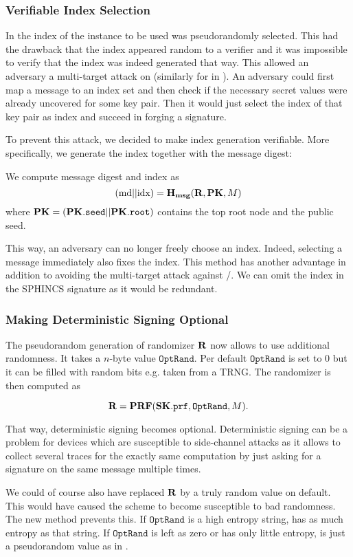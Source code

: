 \subsubsection{Verifiable Index Selection}
In \spc the index of the \horst instance to be used was pseudorandomly selected.
This had the drawback that the index appeared random to a verifier and it was
impossible to verify that the index was indeed generated that way. This allowed
an adversary a multi-target attack on \horst (similarly for \fors in \spx). An
adversary could first map a message to an index set and then check if the
necessary secret values were already uncovered for some \horst key pair. Then it
would just select the index of that \horst key pair as index and succeed in
forging a signature.

To prevent this attack, we decided to make index generation verifiable. More
specifically, we generate the index together with the message digest:

 We compute message digest and index as
        $$( \textrm{md} || \textrm{idx} ) = \mathbf{H_{msg}} ( \mathbf{R}, \mathbf{PK}, M )$$
 where $\mathbf{PK} = ( \mathbf{PK}.\texttt{seed} || \mathbf{PK}.\texttt{root} )$ contains the top root node and the public seed.

 This way, an adversary can no longer freely choose an index. Indeed, selecting
 a message immediately also fixes the index. This method has another advantage
 in addition to avoiding the multi-target
 attack against \fors /\horst. We can omit the index in the SPHINCS
 signature as it would be redundant.

 \subsubsection{Making Deterministic Signing Optional}
 \label{subsec:optrand}
 The pseudorandom generation of randomizer $\mathbf{R}$ now allows to use additional
 randomness. It takes a $n$-byte value $\texttt{OptRand}$. Per default
 $\texttt{OptRand}$ is set to 0 but it can be filled
 with random bits e.g. taken from a TRNG. The randomizer is then computed as

        $$\mathbf{R} = \mathbf{PRF} (\mathbf{SK}.\texttt{prf}, \texttt{OptRand}, M).$$

 That way, deterministic signing becomes optional. Deterministic signing can be
 a problem for devices which are susceptible to side-channel attacks
 as it allows to collect several traces
 for the exactly same computation by just asking for a signature on the same
 message multiple times.

 We could of course also have replaced $\mathbf{R}$ by a truly random value on
 default. This would have caused the scheme to become susceptible to bad
 randomness. The new method prevents this. If $\texttt{OptRand}$ is a high
 entropy string, \Random has as much entropy as that string. If
 $\texttt{OptRand}$ is left as zero or has only little entropy, \Random
 is just a pseudorandom value as in \spc.



